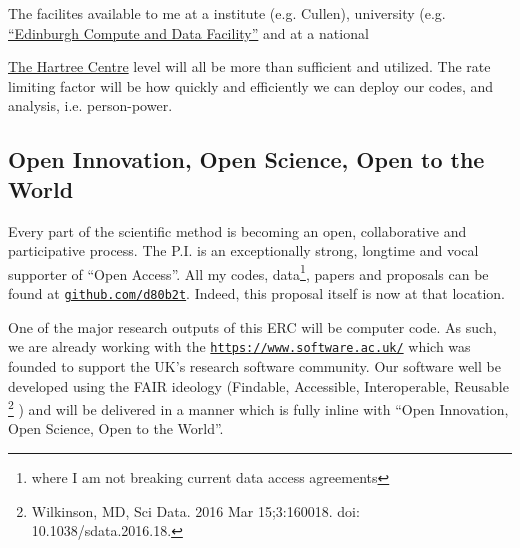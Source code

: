 \documentclass[oneside, a4paper, onecolumn, 11pt]{article}
\begin{document}
\smallskip
\smallskip
\noindent
The facilites available to me at a institute (e.g. Cullen), university
(e.g. \href{https://www.ed.ac.uk/information-services/research-support/research-computing/ecdf}{``Edinburgh
Compute and Data Facility''} and at a national
{\href{https://www.hartree.stfc.ac.uk/Pages/home.aspx}{The Hartree Centre} level will all be more than sufficient and utilized.
The rate limiting factor will be how quickly and efficiently we can deploy our codes, 
and analysis, i.e. person-power. 



\subsection*{Open Innovation, Open Science, Open to the World}
Every part of the scientific method is becoming an open, collaborative and participative process. 
The P.I. is an exceptionally strong, longtime and vocal supporter of ``Open Access''. 
All my codes, data\footnote{where I am not breaking current data access agreements}, papers 
and proposals can be found at \href{github.com/d80b2t}{{\tt github.com/d80b2t}}. 
Indeed, this proposal itself is now at that location. 

One of the major research outputs 
of this ERC will be computer code. 
As such, we are already working with the
\href{The Software Sustainability Institute}{\tt https://www.software.ac.uk/}
which was founded to support the UK’s research software community. 
Our software well be developed using the FAIR ideology (Findable, Accessible, Interoperable, Reusable
\footnote{Wilkinson, MD, Sci Data. 2016 Mar 15;3:160018. doi: 10.1038/sdata.2016.18.}
) 
and will be delivered in a manner which is fully inline 
with ``Open Innovation, Open Science, Open to the World''. 



}
\end{document}
